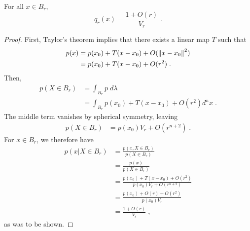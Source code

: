 	\begin{lm}
		For all $x \in B_r$,  
		\begin{equation}
			q_r(x) = \frac{1 + O(r)}{V_r}\;.	
		\end{equation}
	\end{lm}
	\begin{proof}
		First, Taylor's theorem implies that there exists a linear map $T$ such that 
		\begin{align}
			p(x) &= p(x_0) + T(x - x_0) + O(\left\lVert x - x_0\right\rVert^2) \\
			&= p(x_0) + T(x - x_0) + O(r^2)\;. 
		\end{align}
		 Then, 
		\begin{align}
			p(X\in B_r) &= \int_{B_r} p \; d\lambda \\
			&= \int_{B_r} p(x_0) + T(x - x_0) + O(r^2) d^n x\;.
		\end{align}
		The middle term vanishes by spherical symmetry, leaving 
		\begin{align}
			p(X\in B_r) &= p(x_0)V_r  + O(r^{n+2})\;.
		\end{align}
		For $x \in B_r$, we therefore have 
		\begin{align}
			p(x|X \in B_r) &= \frac{p(x,X \in B_r)}{p(X \in B_r)} \\ 
			&= \frac{p(x)}{p(X \in B_r)} \\
			&= \frac{p(x_0) + T(x - x_0) + O(r^2)}{p(x_0)V_r  + O(r^{n+2})} \\
			&= \frac{p(x_0) + O(r) + O(r^2)}{p(x_0)V_r} \\
			&= \frac{1 + O(r)}{V_r}\;,
		\end{align}
		as was to be shown. 
	\end{proof}

